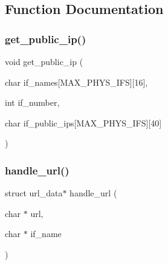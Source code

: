 \subsection{Function Documentation}
\mbox{\label{public-ip_8c_a343631cf6f2ceb1736d8b227c2cf76d3}} 
\subsubsection{\texorpdfstring{get\+\_\+public\+\_\+ip()}{get\_public\_ip()}}
{\footnotesize\ttfamily void get\+\_\+public\+\_\+ip (\begin{DoxyParamCaption}\item[{char}]{if\+\_\+names\mbox{[}\+M\+A\+X\+\_\+\+P\+H\+Y\+S\+\_\+\+I\+F\+S\mbox{]}\mbox{[}16\mbox{]},  }\item[{int}]{if\+\_\+number,  }\item[{char}]{if\+\_\+public\+\_\+ips\mbox{[}\+M\+A\+X\+\_\+\+P\+H\+Y\+S\+\_\+\+I\+F\+S\mbox{]}\mbox{[}40\mbox{]} }\end{DoxyParamCaption})}

\mbox{\label{public-ip_8c_a546e9ee82a2fff0c37e173d76ab08db4}} 
\subsubsection{\texorpdfstring{handle\+\_\+url()}{handle\_url()}}
{\footnotesize\ttfamily struct url\+\_\+data$\ast$ handle\+\_\+url (\begin{DoxyParamCaption}\item[{char $\ast$}]{url,  }\item[{char $\ast$}]{if\+\_\+name }\end{DoxyParamCaption})}

